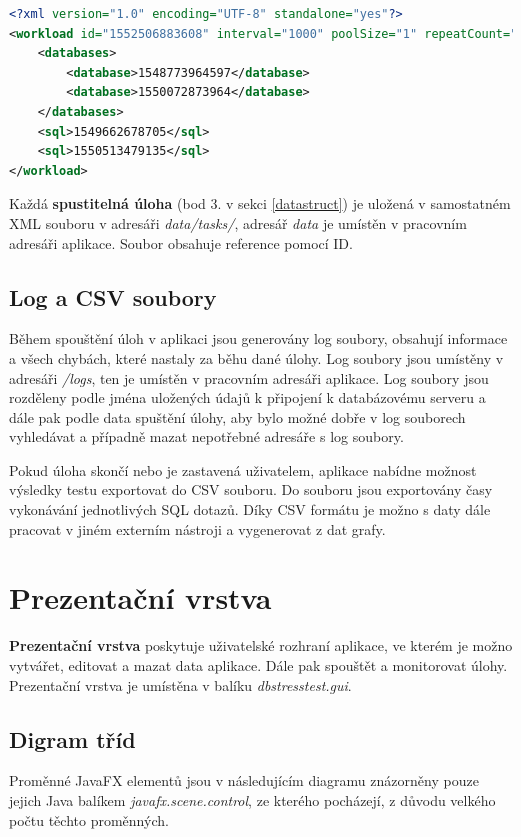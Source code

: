 \documentclass[czech,bachelor,public,dept460,male,cpdeclaration,twoside]{diploma}
\begin{document}
\begin{minipage}{\linewidth}
\begin{lstlisting}[caption=Spustitelná úloha ve formátu XML\label{lst:task},language=XML] 
<?xml version="1.0" encoding="UTF-8" standalone="yes"?>
<workload id="1552506883608" interval="1000" poolSize="1" repeatCount="-1" taskName="SuperTest">
    <databases>
        <database>1548773964597</database>
        <database>1550072873964</database>
    </databases>
    <sql>1549662678705</sql>
    <sql>1550513479135</sql>
</workload>
\end{lstlisting}
Každá \textbf{spustitelná úloha} (bod 3. v sekci \ref{datastruct}) je uložená v samostatném XML souboru v adresáři \textit{data/tasks/}, adresář \textit{data} je umístěn v pracovním adresáři aplikace. Soubor obsahuje reference pomocí ID.
\end{minipage}

\subsection{Log a CSV soubory} \label{logs}
Během spouštění úloh v aplikaci jsou generovány log soubory, obsahují informace a všech chybách, které nastaly za běhu dané úlohy. Log soubory jsou umístěny v adresáři \textit{/logs}, ten je umístěn v pracovním adresáři aplikace. Log soubory jsou rozděleny podle jména uložených údajů k připojení k databázovému serveru a dále pak podle data spuštění úlohy, aby bylo možné dobře v log souborech vyhledávat a případně mazat nepotřebné adresáře s log soubory.

Pokud úloha skončí nebo je zastavená uživatelem, aplikace nabídne možnost výsledky testu exportovat do CSV souboru. Do souboru jsou exportovány časy vykonávání jednotlivých SQL dotazů. Díky CSV formátu je možno s daty dále pracovat v jiném externím nástroji a vygenerovat z dat grafy.

\section{Prezentační vrstva} \label{presentlayer}
\textbf{Prezentační vrstva} poskytuje uživatelské rozhraní aplikace, ve kterém je možno vytvářet, editovat a mazat data aplikace. Dále pak spouštět a monitorovat úlohy. Prezentační vrstva je umístěna v balíku \textit{dbstresstest.gui}.
\subsection{Digram tříd} \label{prezent}
Proměnné JavaFX elementů jsou v následujícím diagramu znázorněny pouze jejich Java balíkem \textit{javafx.scene.control}, ze kterého pocházejí, z důvodu velkého počtu těchto proměnných.
\end{document}
